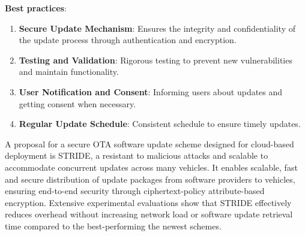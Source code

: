 \textbf{Best practices}:
\begin{enumerate}
    \item \textbf{Secure Update Mechanism}: Ensures the integrity and confidentiality of the update process through authentication and encryption.
    \item \textbf{Testing and Validation}: Rigorous testing to prevent new vulnerabilities and maintain functionality.
    \item \textbf{User Notification and Consent}: Informing users about updates and getting consent when necessary.
    \item \textbf{Regular Update Schedule}: Consistent schedule to ensure timely updates.
\end{enumerate}

A proposal for a secure OTA software update scheme designed for cloud-based deployment is STRIDE, a resistant to malicious attacks and scalable to accommodate concurrent updates across many vehicles.
It enables scalable, fast and secure distribution of update packages from software providers to vehicles, ensuring end-to-end security through ciphertext-policy attribute-based encryption.
Extensive experimental evaluations show that STRIDE effectively reduces overhead without increasing network load or software update retrieval time compared to the best-performing the newest schemes\cite{sota}.
